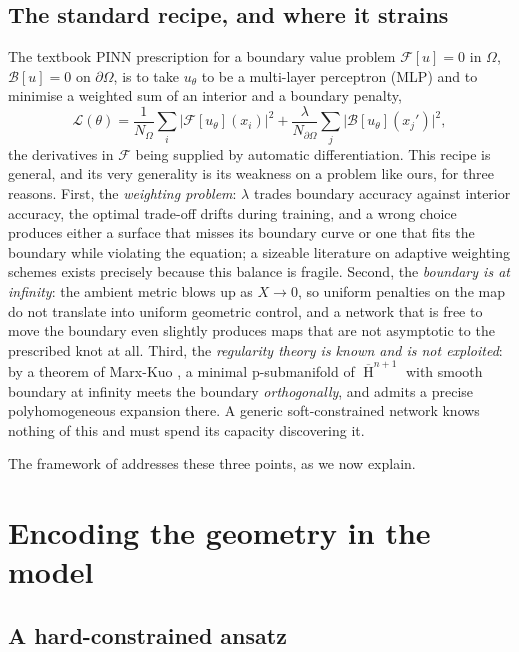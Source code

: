 \documentclass[oneside,british]{amsart}
\numberwithin{equation}{section}
\numberwithin{figure}{section}
\theoremstyle{plain}
\numberwithin{thm}{section}
\theoremstyle{plain}
\theoremstyle{plain}
\theoremstyle{definition}
\theoremstyle{remark}
\DeclareMathOperator{\HH}{\mathrm{H}}
\begin{document}
\subsection{The standard recipe, and where it strains}\label{subsec:vanilla}

The textbook PINN prescription for a boundary value problem
$\mathcal{F}[u]=0$ in $\Omega$, $\mathcal{B}[u]=0$ on $\partial\Omega$,
is to take $u_{\theta}$ to be a multi-layer perceptron (MLP) and to
minimise a weighted sum of an interior and a boundary penalty,
\[
\mathcal{L}(\theta)=\frac{1}{N_{\Omega}}\sum_{i}\bigl|\mathcal{F}[u_{\theta}](x_{i})\bigr|^{2}+\frac{\lambda}{N_{\partial\Omega}}\sum_{j}\bigl|\mathcal{B}[u_{\theta}](x_{j}')\bigr|^{2},
\]
the derivatives in $\mathcal{F}$ being supplied by automatic
differentiation. This recipe is general, and its very generality is
its weakness on a problem like ours, for three reasons. First, the
\emph{weighting problem}: $\lambda$ trades boundary accuracy against
interior accuracy, the optimal trade-off drifts during training, and a
wrong choice produces either a surface that misses its boundary curve
or one that fits the boundary while violating the equation; a sizeable
literature on adaptive weighting schemes exists precisely because this
balance is fragile. Second, the \emph{boundary is at infinity}: the
ambient metric blows up as $X\to0$, so uniform penalties on the map do
not translate into uniform geometric control, and a network that is
free to move the boundary even slightly produces maps that are not
asymptotic to the prescribed knot at all. Third, the \emph{regularity
theory is known and is not exploited}: by a theorem of Marx-Kuo
\cite{MarxKuoRenormalized}, a minimal p-submanifold of
$\overline{\HH}^{n+1}$ with smooth boundary at infinity meets the
boundary \emph{orthogonally}, and admits a precise polyhomogeneous
expansion there. A generic soft-constrained network knows nothing of
this and must spend its capacity discovering it.

The framework of \cite{SchettiniUsula2026} addresses these three points, as we now explain.

\section{Encoding the geometry in the model}\label{sec:geometry}

\subsection{A hard-constrained ansatz}\label{subsec:ansatz}
\end{document}
